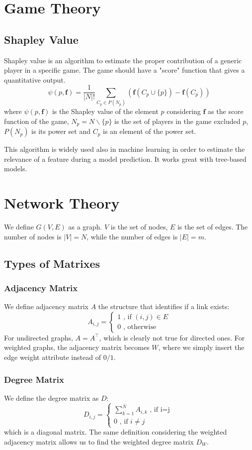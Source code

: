 \documentclass[12pt,a4paper]{article}
\begin{document}
\section{Game Theory}
\subsection{Shapley Value}
Shapley value is an algorithm to estimate the proper contribution of a generic player in a specific game. The game should have a "score" function that gives a quantitative output.
\begin{equation*}
	\psi(p, \pmb{f}) = \dfrac{1}{|N|!} \sum_{C_p \in P(N_p)} \left( \pmb{f}(C_p\cup \{p\}) - \pmb{f}(C_p) \right)
\end{equation*}
where $\psi(p,\pmb{f})$ is the Shapley value of the element $p$ considering $\pmb{f}$ as the score function of the game, $N_p = N\smallsetminus \{p\}$ is the set of players in the game excluded $p$, $P(N_p)$ is its power set and $C_p$ is an element of the power set. 

This algorithm is widely used also in machine learning in order to estimate the relevance of a feature during a model prediction. It works great with tree-based models.


\section{Network Theory}
We define $G(V,E)$ as a graph. $V$ is the set of nodes, $E$ is the set of edges. The number of nodes is $|V|=N$, while the number of edges is $|E|=m$.

\subsection{Types of Matrixes}
\subsubsection*{Adjacency Matrix}
We define adjacency matrix $A$ the structure that identifies if a link exists:
$$
A_{i,j} = \begin{cases}1 \text{ , if } (i,j) \in E \\[1em]
	0 \text{ , otherwise}
\end{cases}
$$
For undirected graphs, $A=A^\intercal$, which is clearly not true for directed ones.
For weighted graphs, the adjacency matrix becomes $W$, where we simply insert the edge weight attribute instead of $0/1$.
\subsubsection*{Degree Matrix}
We define the degree matrix as $D$:
$$
D_{i,j} = \begin{cases} \sum_{k=1}^N A_{i,k} \text{ , if i=j }\\[1em]
	0 \text{ , if } i\neq j 
\end{cases}
$$
which is a diagonal matrix. The same definition considering the weighted adjacency matrix allows us to find the weighted degree matrix $D_W$.
\end{document}
